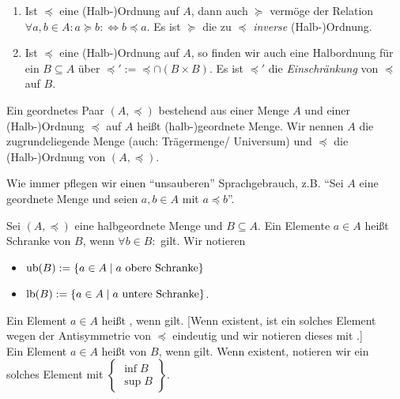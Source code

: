 \documentclass[../../main.tex]{subfiles}
\begin{document}
\begin{bem}\label{12.1.3}
	\begin{enumerate}[\normalfont(a)]
		\item Ist $\preceq$ eine (Halb-)Ordnung auf $A$, dann auch $\succeq$ vermöge der Relation $\forall a,b\in A: a\succeq b:\Longleftrightarrow b\preceq a$. Es ist $\succeq$ die zu $\preceq$ \emph{inverse} (Halb-)Ordnung.
		\item Ist $\preceq$ eine (Halb-)Ordnung auf $A$, so finden wir auch eine Halbordnung für ein $B\subseteq A$ über $\preceq':=\preceq\cap (B\times B)$. Es ist $\preceq'$ die \emph{Einschränkung} von $\preceq$ auf $B$.
	\end{enumerate}
\end{bem}

\begin{df}\label{12.1.4}
	Ein geordnetes Paar $(A,\preceq)$ bestehend aus einer Menge $A$ und einer (Halb-)Ordnung $\preceq$ auf $A$ heißt (halb-)geordnete Menge. Wir nennen $A$ die zugrundeliegende Menge (auch: Trägermenge/ Universum) und $\preceq$ die (Halb-)Ordnung von $(A,\preceq)$.
\end{df}

\begin{bem}\label{12.1.5} 
	Wie immer pflegen wir einen \enquote{unsauberen} Sprachgebrauch, z.B. \enquote{Sei $A$ eine geordnete Menge und seien $a,b\in A$ mit $a\preceq b$}.
\end{bem}

\begin{df}\label{12.1.6}
	Sei $(A,\preceq)$ eine halbgeordnete Menge und $B\subseteq A$. Ein Elemente $a\in A$ heißt  Schranke von $B$, wenn $\forall b\in B:$  gilt. Wir notieren
	\begin{itemize}
		\item $\operatorname{ub}(B):=\{a\in A\mid a\text{ obere Schranke}\}$
		\item $\operatorname{lb}(B):=\{a\in A\mid a\text{ untere Schranke}\}$.
	\end{itemize}

	\noindent Ein Element $a\in A$ heißt , wenn  gilt.  [Wenn existent, ist ein solches Element wegen der Antisymmetrie von $\preceq$ eindeutig und wir notieren dieses mit .]\\
			
	\noindent Ein Element $a\in A$ heißt  von $B$, wenn  gilt. Wenn existent, notieren wir ein solches Element mit $\left\{\begin{matrix*}\inf B \\ \sup B\end{matrix*}\right\}$.
\end{df}
\end{document}

